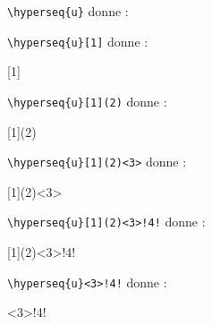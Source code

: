 \documentclass[varwidth, border = 3pt]{standalone}
\begin{document}
\verb#\hyperseq{u}# donne :



\verb#\hyperseq{u}[1]# donne :

[1]


\verb#\hyperseq{u}[1](2)# donne :

[1](2)


\verb#\hyperseq{u}[1](2)<3># donne :

[1](2)<3>


\verb#\hyperseq{u}[1](2)<3>!4!# donne :

[1](2)<3>!4!


\verb#\hyperseq{u}<3>!4!# donne :

<3>!4!
\end{document}
